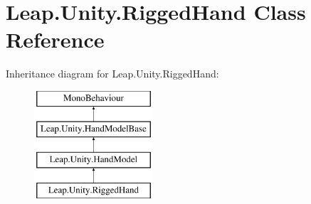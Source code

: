 \hypertarget{class_leap_1_1_unity_1_1_rigged_hand}{}\section{Leap.\+Unity.\+Rigged\+Hand Class Reference}
\label{class_leap_1_1_unity_1_1_rigged_hand}
Inheritance diagram for Leap.\+Unity.\+Rigged\+Hand\+:\begin{figure}[H]
\begin{center}
\leavevmode
\includegraphics[height=4.000000cm]{class_leap_1_1_unity_1_1_rigged_hand}
\end{center}
\end{figure}
